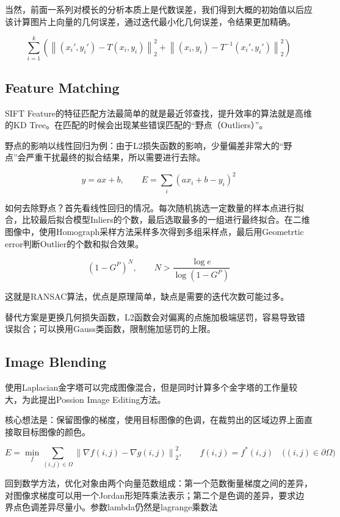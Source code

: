 当然，前面一系列对模长的分析本质上是代数误差，我们得到大概的初始值以后应该计算图片上向量的几何误差，通过迭代最小化几何误差，令结果更加精确。

\[
\sum_{i=1}^{k} \left(
\left\| (x_i', y_i') - T(x_i, y_i) \right\|_2^2
+ \left\| (x_i, y_i) - T^{-1}(x_i', y_i') \right\|_2^2
\right)
\]

\subsection{Feature Matching}

SIFT Feature的特征匹配方法最简单的就是最近邻查找，提升效率的算法就是高维的KD Tree。在匹配的时候会出现某些错误匹配的“野点（Outliers）”。

野点的影响以线性回归为例：由于L2损失函数的影响，少量偏差非常大的“野点”会严重干扰最终的拟合结果，所以需要进行去除。

\[
y = ax + b,
\qquad
E = \sum_i \left(a x_i + b - y_i\right)^2
\]

如何去除野点？首先看线性回归的情况。每次随机挑选一定数量的样本点进行拟合，比较最后拟合模型Inliers的个数，最后选取最多的一组进行最终拟合。在二维图像中，使用Homograph采样方法采样多次得到多组采样点，最后用Geometrtic error判断Outlier的个数和拟合效果。

\[
\left(1 - G^{P}\right)^{N},
\qquad
N > \frac{\log e}{\log\left(1 - G^{P}\right)}
\]

这就是RANSAC算法，优点是原理简单，缺点是需要的迭代次数可能过多。

替代方案是更换几何损失函数，L2函数会对偏离的点施加极端惩罚，容易导致错误拟合；可以换用Gauss类函数，限制施加惩罚的上限。

\subsection{Image Blending}

使用Laplacian金字塔可以完成图像混合，但是同时计算多个金字塔的工作量较大，为此提出Possion Image Editing方法。

核心想法是：保留图像的梯度，使用目标图像的色调，在裁剪出的区域边界上面直接取目标图像的颜色。

\[
E = \min_f \sum_{(i,j) \in \Omega}
\left\| \nabla f(i,j) - \nabla g(i,j) \right\|_2^2,
\qquad
f(i,j) = f^{*}(i,j) \quad \big((i,j) \in \partial\Omega\big)
\]

回到数学方法，优化对象由两个向量范数组成：第一个范数衡量梯度之间的差异，对图像求梯度可以用一个Jordan形矩阵乘法表示；第二个是色调的差异，要求边界点色调差异尽量小。参数lambda仍然是lagrange乘数法


